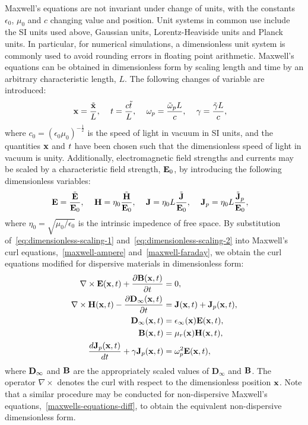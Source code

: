 Maxwell's equations are not invariant under change of units, with the constants $\epsilon_0$, $\mu_0$ and $c$ changing value and position. Unit systems in common use include the SI units used above, Gaussian units, Lorentz-Heaviside units and Planck units.
In particular, for numerical simulations, a dimensionless unit system is commonly used to avoid rounding errors in floating point arithmetic. Maxwell's equations can be obtained in dimensionless form by scaling length and time by an arbitrary characteristic length, $L$. The following changes of variable are introduced:
    \begin{align}
        \label{eq:dimensionless-scaling-1}
        \mathbf{x} &= \frac{\tilde{\mathbf{x}}}{L}, &  \
        t &= \frac{c \tilde{t}}{L}, &  \
        \omega_p &= \frac{\tilde{\omega}_p L}{c}, & \
        \gamma &= \frac{\tilde{\gamma} L}{c},
    \end{align}
where $c_0 = ( \epsilon_0 \mu_0 )^{-\frac{1}{2}}$ is the speed of light in vacuum in SI units, and the quantities $\mathbf{x}$ and $t$ have been chosen such that the dimensionless speed of light in vacuum is unity. Additionally, electromagnetic field strengths and currents may be scaled by a characteristic field strength, $\mathbf{E}_0$, by introducing the following dimensionless variables:
    \begin{align}
        \label{eq:dimensionless-scaling-2}
        \mathbf{E} &= \frac{\tilde{\mathbf{E}}}{\mathbf{E}_0}, &  \
        \mathbf{H} &= \eta_0 \frac{\tilde{\mathbf{H}}}{\mathbf{E}_0}, &  \
        \mathbf{J} &= \eta_0 L \frac{\tilde{\mathbf{J}}}{\mathbf{E}_0}, & \
        \mathbf{J}_p &= \eta_0 L \frac{\tilde{\mathbf{J}}_p}{\mathbf{E}_0},
    \end{align}
    where $\eta_0 = \sqrt{\mu_0 / \epsilon_0}$ is the intrinsic impedence of free space. By substitution of~\eqref{eq:dimensionless-scaling-1} and~\eqref{eq:dimensionless-scaling-2} into Maxwell's curl equations,~\eqref{maxwell-ampere} and~\eqref{maxwell-faraday}, we obtain the curl equations modified for dispersive materials in dimensionless form:
\begin{subequations}
    \label{eq:dimensionless-maxwell}
    \begin{align}
        \nabla \times \mathbf{E}(\mathbf{x},t) + \frac{\partial \mathbf{B}(\mathbf{x}, t) }{\partial t} &= 0, \\
        \nabla \times \mathbf{H}(\mathbf{x},t) - \frac{\partial  \mathbf{D}_{\infty}(\mathbf{x}, t) }{\partial t} &= \mathbf{J}(\mathbf{x},t) + \mathbf{J}_p(\mathbf{x},t), \\
        \mathbf{D}_{\infty}(\mathbf{x},t) &= \epsilon_{\infty}(\mathbf{x}) \mathbf{E}(\mathbf{x},t), \\
        \mathbf{B}(\mathbf{x},t) &= \mu_r(\mathbf{x}) \mathbf{H}(\mathbf{x},t), \\
        \frac{d \mathbf{J}_p(\mathbf{x},t)}{dt} + \gamma \mathbf{J}_p(\mathbf{x},t) &= \omega_p^2 \mathbf{E}(\mathbf{x},t),
    \end{align}
\end{subequations}
where $\mathbf{D}_{\infty}$ and $\mathbf{B}$ are the appropriately scaled values of $\mathbf{D}_{\infty}$ and $\mathbf{B}$. The operator $\nabla \times$ denotes the curl with respect to the dimensionless position $\mathbf{x}$. Note that a similar procedure may be conducted for non-dispersive Maxwell's equations,~\eqref{maxwells-equations-diff}, to obtain the equivalent non-dispersive dimensionless form.

